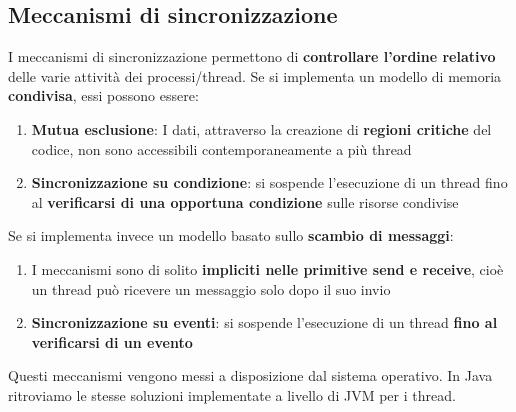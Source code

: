 \documentclass[12pt]{article}
\begin{document}
\subsection{Meccanismi di sincronizzazione}
I meccanismi di sincronizzazione permettono di \textbf{controllare l’ordine relativo} delle varie attività dei processi/thread. Se si implementa un modello di memoria \textbf{condivisa}, essi possono essere:
\begin{enumerate}
    \item \textbf{Mutua esclusione}: I dati, attraverso la creazione di \textbf{regioni critiche} del codice, non sono accessibili contemporaneamente a più thread
    \item \textbf{Sincronizzazione su condizione}: si sospende l’esecuzione di un thread fino al \textbf{verificarsi di una opportuna condizione} sulle risorse condivise
\end{enumerate}
Se si implementa invece un modello basato sullo \textbf{scambio di messaggi}:
\begin{enumerate}
    \item I meccanismi sono di solito \textbf{impliciti nelle primitive send e receive}, cioè un thread può ricevere un messaggio solo dopo il suo invio
    \item \textbf{Sincronizzazione su eventi}: si sospende l’esecuzione di un thread \textbf{fino al verificarsi di un evento}
\end{enumerate}
Questi meccanismi vengono messi a disposizione dal sistema operativo. In Java ritroviamo le stesse
soluzioni implementate a livello di JVM per i thread.
\end{document}
